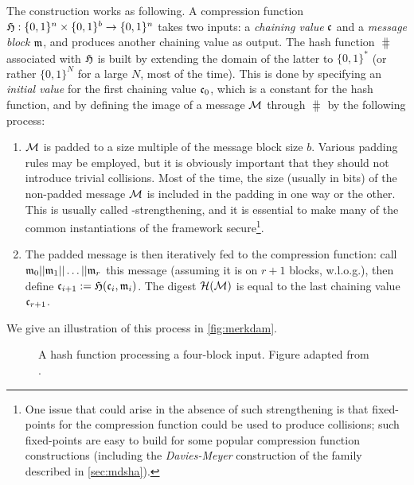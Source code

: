 The construction works as following. A compression function $\operatorname{\mathfrak{H}} : \{0,1\}^n \times \{0,1\}^b \rightarrow \{0,1\}^n$
takes two inputs: a \emph{chaining value} $\mathfrak{c}$ and a \emph{message block} $\mathfrak{m}$, and produces another chaining value as output.
The hash function $\hash$ associated with $\operatorname{\mathfrak{H}}$ is built by extending the domain of the latter to $\{0,1\}^*$ (or rather $\{0,1\}^N$ for a large $N$, most of the time).
This is done by specifying an \emph{initial value} \iv for the first chaining value $\mathfrak{c}_0$, which is a constant for the hash function, and by defining the image
of a message $\mathcal{M}$ through $\hash$ by the following process:
\begin{enumerate}
\item $\mathcal{M}$ is padded to a size multiple of the message block size $b$. Various padding rules may be employed, but it is obviously important that they should not
introduce trivial collisions. Most of the time, the size (usually in bits) of the non-padded message $\mathcal{M}$ is included in the padding in one way or the other.
This is usually called \merkdam-strengthening, and it is essential to make many of the common instantiations of the framework secure\footnote{One issue that
could arise in the absence of such strengthening is that fixed-points for the compression function could be used to produce collisions; such fixed-points
are easy to build for some popular compression function constructions (including the \emph{Davies-Meyer} construction
of the \mdsha family described in \autoref{sec:mdsha}).}.
\item The padded message is then iteratively fed to the compression function: call $\messblock_0||\messblock_1||\linebreak\ldots||\messblock_r$ this message (assuming
it is on $r+1$ blocks, w.l.o.g.), then define $\mathfrak{c}_{i+1} := \operatorname{\mathfrak{H}}(\mathfrak{c}_i, \mathfrak{m}_i)$. The digest $\operatorname{\mathcal{H}}(\mathcal{M})$ is equal to the last
chaining value $\mathfrak{c}_{r+1}$.
\end{enumerate}
We give an illustration of this process in \autoref{fig:merkdam}.

\begin{figure}[!htb]
\begin{center}

\caption{A \merkdam hash function processing a four-block input. Figure adapted from \cite{TiKZ:Cryptographers}.\label{fig:merkdam}}
\end{center}
\end{figure} 

